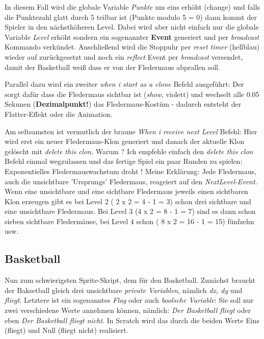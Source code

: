 In diesem Fall wird die globale Variable \textit{Punkte} um eins erhöht (change) und falls die Punktezahl glatt durch 5 teilbar ist (Punkte modulo 5 = 0) dann kommt der Spieler in den nächsthöheren Level. Dabei wird aber nicht einfach nur die globale Variable \textit{Level} erhöht sondern ein sogenannter \textbf{Event} generiert und per \textit{broadcast} Kommando verkündet. Anschließend wird die Stoppuhr per \textit{reset timer} (hellblau) wieder auf zurückgesetzt und noch ein \textit{reflect} Event per \textit{broadcast} versendet, damit der Basketball weiß dass er von der Fledermaus abprallen soll.

Parallel dazu wird ein zweiter \textit{when i start as a clone} Befehl ausgeführt: Der sorgt dafür dass die Fledermaus sichtbar ist (\textit{show}, violett) und wechselt alle 0.05 Sekunen (\textbf{Dezimalpunkt!}) das Fledermaus-Kostüm - dadurch entsteht der Flatter-Effekt oder die Animation.

Am seltsamsten ist vermutlich der braune \textit{When i receive next Level} Befehl: Hier wird erst ein neuer Fledermaus-Klon generiert und danach der aktuelle Klon gelöscht mit \textit{delete this clon}. Warum ? Ich empfehle einfach den \textit{delete this clon} Befehl einmal wegzulassen und das fertige Spiel ein paar Runden zu spielen: Exponentielles Fledermauswachstum droht ! Meine Erklärung: Jede Fledermaus, auch die unsichtbare 'Ursprungs' Fledermaus, reageiert auf den \textit{NextLevel-Event}. Wenn eine unsichtbare und eine sichtbare Fledermaus jeweils einen sichtbaren Klon erzeugen gibt es bei Level 2 ( 2 x 2 = 4 - 1 = 3) schon drei sichtbare und eine unsichtbare Fledermaus. Bei Level 3 (4 x 2 = 8 - 1 = 7) sind es dann schon sieben sichtbare Fledermäuse, bei Level 4 schon ( 8 x 2 = 16 - 1 = 15) fünfzehn usw. 

\subsection*{Basketball}

Nun zum schwierigsten Sprite-Skript, dem für den Basketball. Zunächst braucht der Baksetball gleich drei unsichtbare  \textit{private Variablen}, nämlich \textit{dx, dy} und \textit{fliegt}. Letztere ist ein sogenanntes \textit{Flag} oder auch \textit{boolsche Variable}: Sie soll nur zwei verschiedene Werte annehmen können, nämlich: \textit{Der Basketball fliegt} oder eben  \textit{Der Basketball fliegt nicht}. In Scratch wird das durch die beiden Werte Eins (fliegt) und Null (fliegt nicht) realisiert. 

